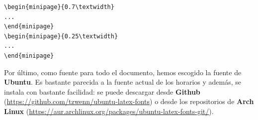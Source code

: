 \begin{verbatim}
\begin{minipage}{0.7\textwidth}
...
\end{minipage}
\begin{minipage}{0.25\textwidth}
...
\end{minipage}
\end{verbatim}

Por último, como fuente para todo el documento, hemos escogido la fuente de \textbf{Ubuntu}. Es bastante parecida a la fuente actual de los horarios y además, se instala con bastante facilidad: se puede descargar desde \textbf{Github} (\url{https://github.com/tzwenn/ubuntu-latex-fonts}) o desde los repositorios de \textbf{Arch Linux} (\url{https://aur.archlinux.org/packages/ubuntu-latex-fonts-git/}).
